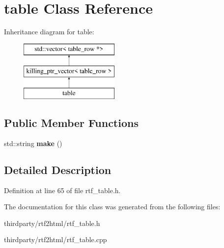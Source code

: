 \hypertarget{classtable}{}\section{table Class Reference}
\label{classtable}
Inheritance diagram for table\+:\begin{figure}[H]
\begin{center}
\leavevmode
\includegraphics[height=3.000000cm]{classtable}
\end{center}
\end{figure}
\subsection*{Public Member Functions}
\begin{DoxyCompactItemize}
\item 
\mbox{\label{classtable_a40e46dcf651210740943ff98fdcde348}} 
std\+::string {\bfseries make} ()
\end{DoxyCompactItemize}


\subsection{Detailed Description}


Definition at line 65 of file rtf\+\_\+table.\+h.



The documentation for this class was generated from the following files\+:\begin{DoxyCompactItemize}
\item 
thirdparty/rtf2html/rtf\+\_\+table.\+h\item 
thirdparty/rtf2html/rtf\+\_\+table.\+cpp\end{DoxyCompactItemize}

